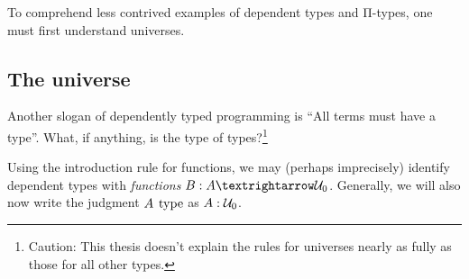 \documentclass[./thesis.tex]{subfiles}
\begin{document}
To comprehend less contrived examples of dependent types and Π-types, one must
first understand universes.

\subsection{The universe}
\label{subsec:the-universe}

Another slogan of dependently typed programming is ``All terms must have a
type''. What, if anything, is the type of types?\footnote{Caution: This thesis
  doesn't explain the rules for universes nearly as fully as those for all other
  types.}


Using the introduction rule for functions, we may (perhaps imprecisely)
identify dependent types with \textit{functions} $B:A→\universei{0}$. 
Generally, we will also now write the judgment $A\hspace{0.4em}\text{type}$ as $A:\mathcal{U}_{0}$.
\end{document}
